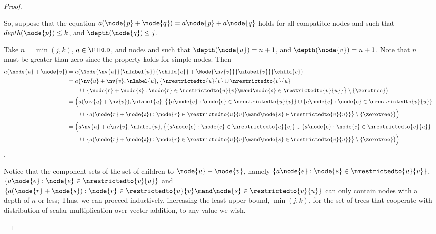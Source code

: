 \begin{proposition}
\begin{proof}
\begin{description}
      So, suppose that the equation \(a ( \node{p} + \node{q}) =
      a \node{p} + a \node{q}\) holds for all compatible nodes  and
       such that \(depth(\node{p}) \leq k\), and
      \(\depth(\node{q}) \leq j\).

      Take \(n = \min(j, k)\), \(a\in\FIELD\), and nodes  and  such that
      \(\depth(\node{u}) = n+1\), and \(\depth(\node{v}) = n+1\).
      Note that \(n\) must be greater than zero since the property holds for simple
      nodes.  Then
      \begin{align*}
        a(\node{u} + \node{v}) &= a (\Node{\nv{u}}{\nlabel{u}}{\child{u}} + \Node{\nv{v}}{\nlabel{v}}{\child{v}}\\ 
        &= a \bigl(\nv{u} + \nv{v}, \nlabel{u}, \bigl\{\nrestrictedto{u}{v} \cup \nrestrictedto{v}{u} \\
        &\qquad \cup \hspace{2pt} \{\node{r} + \node{s}:  \node{r} \in \restrictedto{u}{v}\mand \node{s} \in \restrictedto{v}{u} \} \bigr\} \setminus \{\zerotree\} \bigr) \\
        &= \Bigl(a (\nv{u} + \nv{v}), \nlabel{u}, 
        \bigl\{\{a \node{e}: \node{e} \in \nrestrictedto{u}{v}\} \cup \{a \node{e}: \node{e} \in \nrestrictedto{v}{u}\} \\
        &\qquad \cup \hspace{2pt} \{a (\node{r} + \node{s}):  \node{r} \in \restrictedto{u}{v}\mand \node{s} \in \restrictedto{v}{u} \} \bigr\} \setminus \{\zerotree\} \bigr)\Bigr) \\
        &= \Bigl(a \nv{u} + a \nv{v}, \nlabel{u},  
        \bigl\{\{a \node{e}: \node{e} \in \nrestrictedto{u}{v}\} \cup \{a \node{e}: \node{e} \in \nrestrictedto{v}{u}\} \\
        &\qquad \cup \hspace{2pt} \{a (\node{r} + \node{s}):  \node{r} \in \restrictedto{u}{v}\mand \node{s} \in \restrictedto{v}{u} \} \bigr\} \setminus \{\zerotree\} \bigr)\Bigr)
      \end{align*}.

      Notice that the component sets of the set of children to \(\node{u} +
      \node{v}\), namely \(\{a \node{e}: \node{e} \in
      \nrestrictedto{u}{v}\}\),  
      \(\{a \node{e}: \node{e} \in
      \nrestrictedto{v}{u}\}\) and \(\{a (\node{r} + \node{s}):
      \node{r} \in \restrictedto{u}{v}\mand \node{s} \in
      \restrictedto{v}{u} \}\) can only contain nodes with a depth of
      \(n\) or less; Thus, we can proceed inductively, increasing
      the least upper bound, \(\min(j, k)\), for the set of trees
      that cooperate with distribution of scalar multiplication over
      vector addition, to any value we wish.


\end{description}
\end{proof}
\end{proposition}
